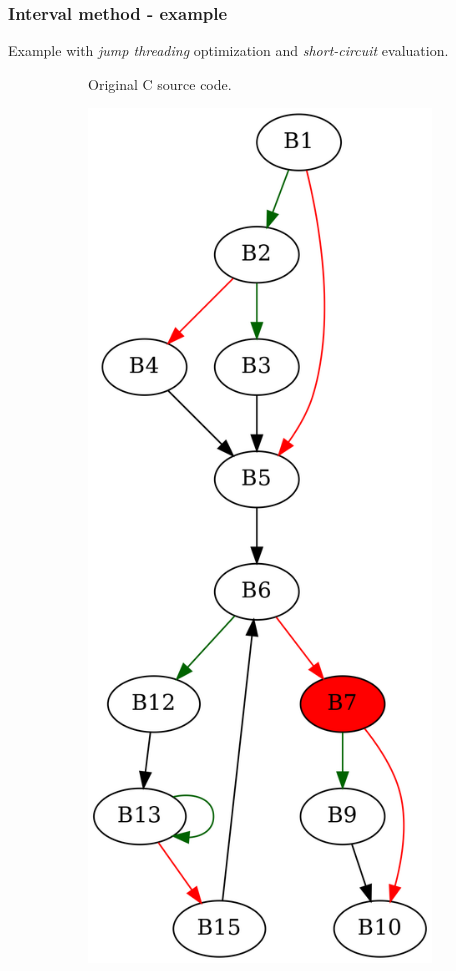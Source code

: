 \documentclass[aspectratio=1610]{beamer}
\begin{document}
\begin{frame}[noframenumbering]
	\frametitle{Interval method - example}
	Example with \textit{jump threading} optimization and \textit{short-circuit} evaluation.
	\begin{figure}[htbp]
		\centering
		\begin{subfigure}[b]{0.30\textwidth}
			\centering
			
			\caption{Original C source code.}
		\end{subfigure}
		\begin{subfigure}[b]{0.50\textwidth}
			\centering
			\includegraphics[height=0.6\paperheight]{inc/methods/interval/example/sample/f_0001b.png}

\end{subfigure}
\end{figure}
\end{frame}
\end{document}
